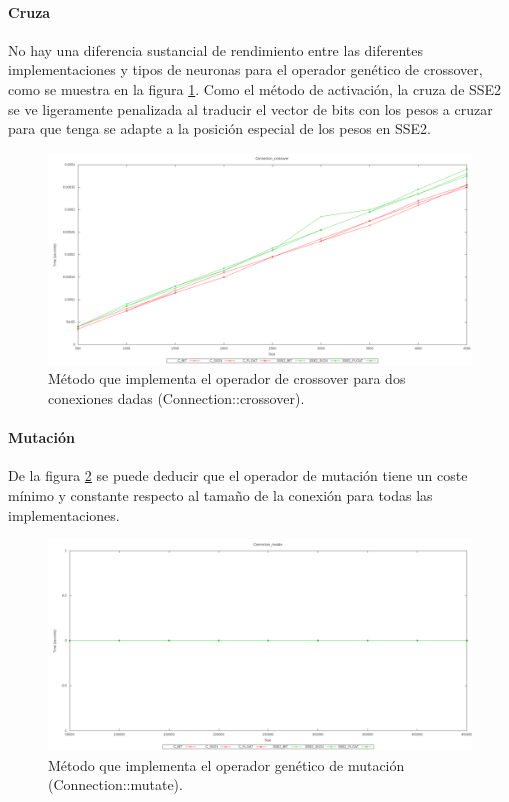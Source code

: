 \documentclass[11pt]{article}
\begin{document}
\begin{titlepage}
\paragraph{Cruza}
\label{sec-6-1-1-3}


No hay una diferencia sustancial de rendimiento entre las diferentes implementaciones y tipos de neuronas para el operador genético de crossover, como se muestra en la figura \ref{grafImplCrossover}. Como el método de activación, la cruza de SSE2 se ve ligeramente penalizada al traducir el vector de bits con los pesos a cruzar para que tenga se adapte a la posición especial de los pesos en SSE2.

\begin{figure}[htb]
\centering
\includegraphics[width=\textwidth]{./img/Connection_crossover.png}
\caption{\label{grafImplCrossover}Método que implementa el operador de crossover para dos conexiones dadas (Connection::crossover).}
\end{figure}
\newpage
\paragraph{Mutación}
\label{sec-6-1-1-4}


De la figura \ref{grafImplMutation} se puede deducir que el operador de mutación tiene un coste mínimo y constante respecto al tamaño de la conexión para todas las implementaciones.

\begin{figure}[htb]
\centering
\includegraphics[width=\textwidth]{./img/Connection_mutate.png}
\caption{\label{grafImplMutation}Método que implementa el operador genético de mutación (Connection::mutate).}
\end{figure}
\newpage

\end{titlepage}
\end{document}
